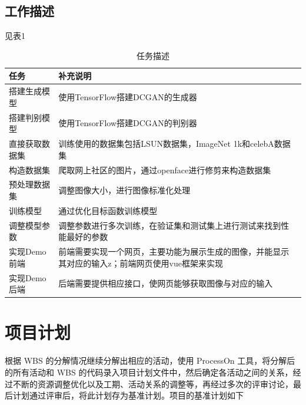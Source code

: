 \documentclass[
  hyperref, a4paper]{ctexart}
\begin{document}
\hypertarget{ux5de5ux4f5cux63cfux8ff0}{%
\subsection{工作描述}\label{ux5de5ux4f5cux63cfux8ff0}}

见表1

\begin{table}
    \caption{任务描述}
    \centering
    \begin{tabular}{|p{5.0cm}<{\centering}|p{7.5cm}<{\centering}|}
    \hline
    任务       & 补充说明                                                 \\ \hline
    搭建生成模型   & 使用TensorFlow搭建DCGAN的生成器                             \\ \hline
    搭建判别模型   & 使用TensorFlow搭建DCGAN的判别器                              \\ \hline
    直接获取数据集  & 训练使用的数据集包括LSUN数据集，ImageNet 1k和celebA数据集             \\ \hline
    构造数据集    & 爬取网上社区的图片，通过openface进行修剪来构造数据集                      \\ \hline
    预处理数据集   & 调整图像大小，进行图像标准化处理                                    \\ \hline
    训练模型     & 通过优化目标函数训练模型                                        \\ \hline
    调整模型参数   & 调整参数进行多次训练，在验证集和测试集上进行测试来找到性能最好的参数                  \\ \hline
    实现Demo前端 & 前端需要实现一个网页，主要功能为展示生成的图像，并能显示其对应的输入z；前端网页使用vue框架来实现   \\ \hline
    实现Demo后端 & 后端需要提供相应接口，使网页能够获取图像与对应的输入                          \\ \hline
    \end{tabular}
\end{table}

\hypertarget{ux9879ux76eeux8ba1ux5212}{%
\section{项目计划}\label{ux9879ux76eeux8ba1ux5212}}

根据 WBS 的分解情况继续分解出相应的活动，使用 ProcessOn
工具，将分解后的所有活动和 WBS
的代码录入项目计划文件中，然后确定各活动之间的关系，经过不断的资源调整优化以及工期、活动关系的调整等，再经过多次的评审讨论，最后计划通过评审后，将此计划存为基准计划。项目的基准计划如下
\end{document}
